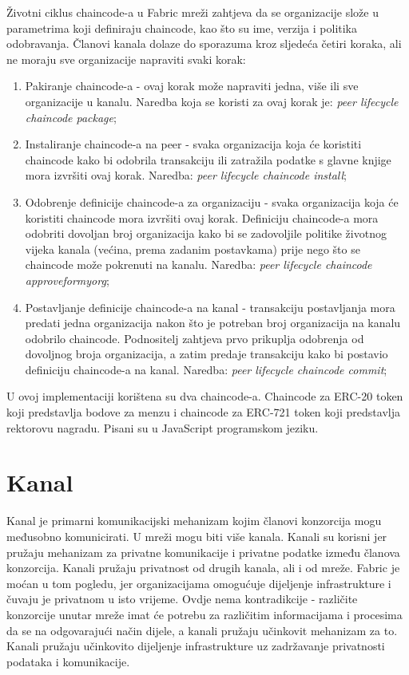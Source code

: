 \documentclass[times, utf8, diplomski]{fer}
\begin{document}
Životni ciklus chaincode-a u Fabric mreži zahtjeva da se organizacije slože u parametrima koji definiraju chaincode, kao što su ime, verzija i politika odobravanja.  Članovi kanala dolaze do sporazuma kroz sljedeća četiri koraka, ali ne moraju sve organizacije napraviti svaki korak:

\begin{enumerate}
\item Pakiranje chaincode-a - ovaj korak može napraviti jedna,  više ili sve organizacije u kanalu.  Naredba koja se koristi za ovaj korak je: 
\textit{peer lifecycle chaincode package};

\item Instaliranje chaincode-a na peer - svaka organizacija koja će koristiti chaincode kako bi odobrila transakciju ili zatražila podatke s glavne knjige mora izvršiti ovaj korak.  Naredba:
\textit{peer lifecycle chaincode install};

\item Odobrenje definicije chaincode-a za organizaciju - svaka organizacija koja će koristiti chaincode mora izvršiti ovaj korak.  Definiciju chaincode-a mora odobriti dovoljan broj organizacija kako bi se zadovoljile politike životnog vijeka kanala (većina,  prema zadanim postavkama) prije nego što se chaincode može pokrenuti na kanalu.  Naredba:
\textit{peer lifecycle chaincode approveformyorg};

\item  Postavljanje definicije chaincode-a na kanal - transakciju postavljanja mora predati jedna organizacija nakon što je potreban broj organizacija na kanalu odobrilo chaincode. Podnositelj zahtjeva prvo prikuplja odobrenja od dovoljnog broja organizacija,  a zatim predaje transakciju kako bi postavio definiciju chaincode-a na kanal. Naredba:
\textit{peer lifecycle chaincode commit};
\end{enumerate}

U ovoj implementaciji korištena su dva chaincode-a. Chaincode za ERC-20 token koji predstavlja bodove za menzu i chaincode za ERC-721 token koji predstavlja rektorovu nagradu. Pisani su u JavaScript programskom jeziku.

\section{Kanal}

Kanal je primarni komunikacijski mehanizam kojim članovi konzorcija mogu međusobno komunicirati. U mreži mogu biti više kanala. Kanali su korisni jer pružaju mehanizam za privatne komunikacije i privatne podatke između članova konzorcija. Kanali pružaju privatnost od drugih kanala, ali i od mreže. Fabric je moćan u tom pogledu, jer organizacijama omogućuje dijeljenje infrastrukture i čuvaju je privatnom u isto vrijeme. Ovdje nema kontradikcije - različite konzorcije unutar mreže imat će potrebu za različitim informacijama i procesima da se na odgovarajući način dijele, a kanali pružaju učinkovit mehanizam za to. Kanali pružaju učinkovito dijeljenje infrastrukture uz zadržavanje privatnosti podataka i komunikacije. \cite{Fabric}
\end{document}
